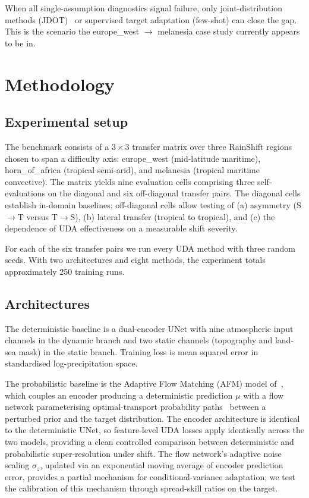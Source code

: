 \documentclass{article}
\begin{document}
When all single-assumption diagnostics signal failure, only
joint-distribution methods (JDOT)~\citep{courty2017jdot} or supervised
target adaptation (few-shot) can close the gap. This is the scenario
the europe\_west $\to$ melanesia case study currently appears to be in.

\section{Methodology}

\subsection{Experimental setup}

The benchmark consists of a $3\times 3$ transfer matrix over three
RainShift regions chosen to span a difficulty axis: europe\_west
(mid-latitude maritime), horn\_of\_africa (tropical semi-arid), and
melanesia (tropical maritime convective). The matrix yields nine
evaluation cells comprising three self-evaluations on the diagonal and
six off-diagonal transfer pairs. The diagonal cells establish in-domain
baselines; off-diagonal cells allow testing of (a) asymmetry (S$\to$T
versus T$\to$S), (b) lateral transfer (tropical to tropical), and (c)
the dependence of UDA effectiveness on a measurable shift severity.

For each of the six transfer pairs we run every UDA method with three
random seeds. With two architectures and eight methods, the experiment
totals approximately 250 training runs.

\subsection{Architectures}

The deterministic baseline is a dual-encoder UNet with nine
atmospheric input channels in the dynamic branch and two static
channels (topography and land-sea mask) in the static branch. Training
loss is mean squared error in standardised log-precipitation space.

The probabilistic baseline is the Adaptive Flow Matching (AFM) model
of~\citet{fotiadis2025adaptive}, which couples an encoder producing a
deterministic prediction $\mu$ with a flow network parameterising
optimal-transport probability paths~\citep{lipman2023flow} between a
perturbed prior and the target distribution. The encoder architecture
is identical to the deterministic UNet, so feature-level UDA losses
apply identically across the two models, providing a clean controlled
comparison between deterministic and probabilistic super-resolution
under shift. The flow network's adaptive noise scaling $\sigma_z$,
updated via an exponential moving average of encoder prediction error,
provides a partial mechanism for conditional-variance adaptation; we
test the calibration of this mechanism through spread-skill ratios on
the target.
\end{document}
